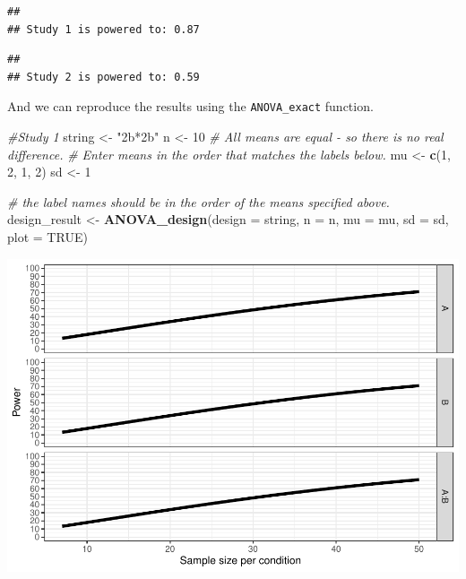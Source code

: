 \documentclass[
]{book}
\newenvironment{Shaded}{\begin{snugshade}}{\end{snugshade}}
\newcommand{\CommentTok}[1]{\textcolor[rgb]{0.56,0.35,0.01}{\textit{#1}}}
\newcommand{\DataTypeTok}[1]{\textcolor[rgb]{0.13,0.29,0.53}{#1}}
\newcommand{\DecValTok}[1]{\textcolor[rgb]{0.00,0.00,0.81}{#1}}
\newcommand{\KeywordTok}[1]{\textcolor[rgb]{0.13,0.29,0.53}{\textbf{#1}}}
\newcommand{\NormalTok}[1]{#1}
\newcommand{\OtherTok}[1]{\textcolor[rgb]{0.56,0.35,0.01}{#1}}
\newcommand{\StringTok}[1]{\textcolor[rgb]{0.31,0.60,0.02}{#1}}
\begin{document}
\begin{verbatim}
## 
## Study 1 is powered to: 0.87
\end{verbatim}

\begin{verbatim}
## 
## Study 2 is powered to: 0.59
\end{verbatim}

And we can reproduce the results using the \texttt{ANOVA\_exact} function.

\begin{Shaded}
\begin{Highlighting}[]
\CommentTok{#Study 1}
\NormalTok{string <-}\StringTok{ "2b*2b"}
\NormalTok{n <-}\StringTok{ }\DecValTok{10}
\CommentTok{# All means are equal - so there is no real difference.}
\CommentTok{# Enter means in the order that matches the labels below.}
\NormalTok{mu <-}\StringTok{ }\KeywordTok{c}\NormalTok{(}\DecValTok{1}\NormalTok{, }\DecValTok{2}\NormalTok{, }\DecValTok{1}\NormalTok{, }\DecValTok{2}\NormalTok{) }
\NormalTok{sd <-}\StringTok{ }\DecValTok{1}

\CommentTok{# the label names should be in the order of the means specified above.}
\NormalTok{design_result <-}\StringTok{ }\KeywordTok{ANOVA_design}\NormalTok{(}\DataTypeTok{design =}\NormalTok{ string,}
                   \DataTypeTok{n =}\NormalTok{ n, }
                   \DataTypeTok{mu =}\NormalTok{ mu, }
                   \DataTypeTok{sd =}\NormalTok{ sd, }
                   \DataTypeTok{plot =} \OtherTok{TRUE}\NormalTok{)}
\end{Highlighting}
\end{Shaded}

\includegraphics{SuperpowerValidation_files/figure-latex/unnamed-chunk-216-1.pdf}
\end{document}
